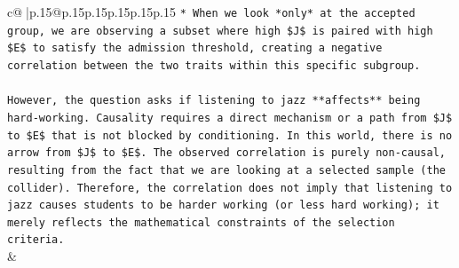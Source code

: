 \documentclass{article}
\begin{document}
{\begin{supertabular}{c@{$\;$}|p{.15\linewidth}@{}p{.15\linewidth}p{.15\linewidth}p{.15\linewidth}p{.15\linewidth}p{.15\linewidth}}
{{{\texttt{*   When we look *only* at the accepted group, we are observing a subset where high \$J\$ is paired with high \$E\$ to satisfy the admission threshold, creating a negative correlation between the two traits within this specific subgroup.} \\
\\ 
\texttt{However, the question asks if listening to jazz **affects** being hard{-}working. Causality requires a direct mechanism or a path from \$J\$ to \$E\$ that is not blocked by conditioning. In this world, there is no arrow from \$J\$ to \$E\$. The observed correlation is purely non{-}causal, resulting from the fact that we are looking at a selected sample (the collider). Therefore, the correlation does not imply that listening to jazz causes students to be harder working (or less hard working); it merely reflects the mathematical constraints of the selection criteria.} \\
            }
        }
    }
    & \\ \\


\end{supertabular}}
\end{document}
